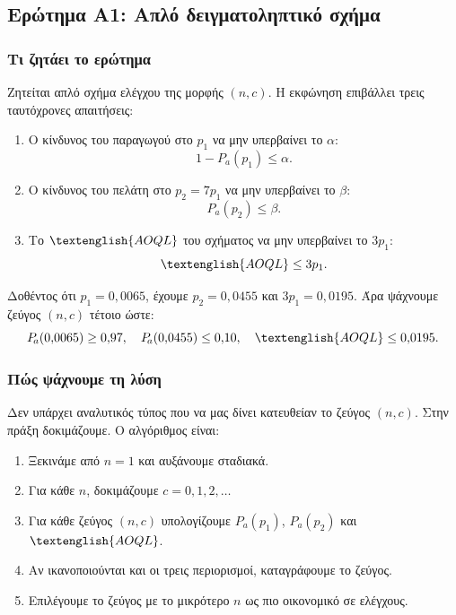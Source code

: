 \documentclass[12pt,a4paper]{article}
\newcommand{\Pa}{P_{\!a}}
\newcommand{\AOQL}{\textenglish{AOQL}}
\begin{document}
\subsection{Ερώτημα Α1: Απλό δειγματοληπτικό σχήμα}

\subsubsection*{Τι ζητάει το ερώτημα}

Ζητείται απλό σχήμα ελέγχου της μορφής \((n,c)\). Η εκφώνηση επιβάλλει τρεις
ταυτόχρονες απαιτήσεις:

\begin{enumerate}[leftmargin=2.2em]
    \item Ο κίνδυνος του παραγωγού στο \(p_1\) να μην υπερβαίνει το \(\alpha\):
    \[
        1-\Pa(p_1)\le \alpha.
    \]
    \item Ο κίνδυνος του πελάτη στο \(p_2=7p_1\) να μην υπερβαίνει το \(\beta\):
    \[
        \Pa(p_2)\le \beta.
    \]
    \item Το \(\AOQL\) του σχήματος να μην υπερβαίνει το \(3p_1\):
    \[
        \AOQL\le 3p_1.
    \]
\end{enumerate}

\begin{summarybox}
Δοθέντος ότι \(p_1=0{,}0065\), έχουμε \(p_2=0{,}0455\) και \(3p_1=0{,}0195\).
Άρα ψάχνουμε ζεύγος \((n,c)\) τέτοιο ώστε:
\[
    \Pa(0{,}0065)\ge 0{,}97,\quad \Pa(0{,}0455)\le 0{,}10,\quad \AOQL\le 0{,}0195.
\]
\end{summarybox}

\subsubsection*{Πώς ψάχνουμε τη λύση}

Δεν υπάρχει αναλυτικός τύπος που να μας δίνει κατευθείαν το ζεύγος \((n,c)\).
Στην πράξη δοκιμάζουμε. Ο αλγόριθμος είναι:

\begin{enumerate}[leftmargin=2.2em]
    \item Ξεκινάμε από \(n=1\) και αυξάνουμε σταδιακά.
    \item Για κάθε \(n\), δοκιμάζουμε \(c=0,1,2,\dots\)
    \item Για κάθε ζεύγος \((n,c)\) υπολογίζουμε \(\Pa(p_1)\), \(\Pa(p_2)\)
    και \(\AOQL\).
    \item Αν ικανοποιούνται και οι τρεις περιορισμοί, καταγράφουμε το ζεύγος.
    \item Επιλέγουμε το ζεύγος με το μικρότερο \(n\) ως πιο οικονομικό σε
    ελέγχους.
\end{enumerate}
\end{document}
